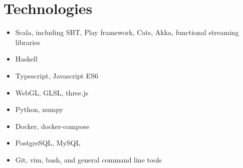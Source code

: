 \documentclass[10pt]{article}
\begin{document}
\section*{Technologies}
\begin{multicols}{2}
\begin{itemize}
    \itemsep0em
    \item Scala, including SBT, Play framework, Cats, Akka, functional streaming libraries
    \item Haskell
    \item Typescript, Javascript ES6
    \item WebGL, GLSL, three.js
    \item Python, numpy
    \item Docker, docker-compose
    \item PostgreSQL, MySQL
    \item Git, vim, bash, and general command line tools
\end{itemize}
\end{multicols}
\end{document}
